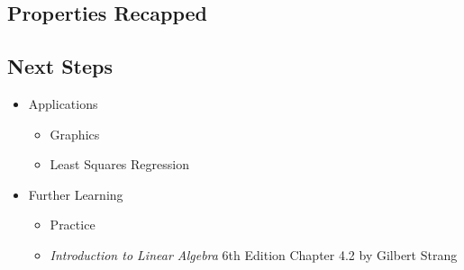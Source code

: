 \documentclass[12pt]{beamer}
\begin{document}
\subsection{Properties Recapped}

\subsection{Next Steps}

\begin{frame}
    \begin{itemize}
        \item Applications
              \begin{itemize}
                  \item Graphics
                  \item Least Squares Regression
              \end{itemize}
        \item Further Learning
              \begin{itemize}
                  \item Practice
                  \item \textit{Introduction to Linear Algebra} 6th Edition Chapter 4.2 by Gilbert Strang
              \end{itemize}
    \end{itemize}
\end{frame}
\end{document}
